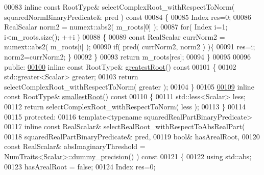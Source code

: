 \begin{DoxyCode}
00083     \textcolor{keyword}{inline} \textcolor{keyword}{const} RootType& selectComplexRoot\_withRespectToNorm( squaredNormBinaryPredicate& pred )\textcolor{keyword}{ const}
00084 \textcolor{keyword}{    }\{
00085       Index res=0;
00086       RealScalar norm2 = numext::abs2( m\_roots[0] );
00087       \textcolor{keywordflow}{for}( Index i=1; i<m\_roots.size(); ++i )
00088       \{
00089         \textcolor{keyword}{const} RealScalar currNorm2 = numext::abs2( m\_roots[i] );
00090         \textcolor{keywordflow}{if}( pred( currNorm2, norm2 ) )\{
00091           res=i; norm2=currNorm2; \}
00092       \}
00093       \textcolor{keywordflow}{return} m\_roots[res];
00094     \}
00095 
00096   \textcolor{keyword}{public}:
\hyperlink{class_eigen_1_1_polynomial_solver_base_a0327769cc88877a79c7c838f03d78384}{00100}     \textcolor{keyword}{inline} \textcolor{keyword}{const} RootType& \hyperlink{class_eigen_1_1_polynomial_solver_base_a0327769cc88877a79c7c838f03d78384}{greatestRoot}()\textcolor{keyword}{ const}
00101 \textcolor{keyword}{    }\{
00102       std::greater<Scalar> greater;
00103       \textcolor{keywordflow}{return} selectComplexRoot\_withRespectToNorm( greater );
00104     \}
00105 
\hyperlink{class_eigen_1_1_polynomial_solver_base_a64389d0acf586c772fb3d1db47a3f7ef}{00109}     \textcolor{keyword}{inline} \textcolor{keyword}{const} RootType& \hyperlink{class_eigen_1_1_polynomial_solver_base_a64389d0acf586c772fb3d1db47a3f7ef}{smallestRoot}()\textcolor{keyword}{ const}
00110 \textcolor{keyword}{    }\{
00111       std::less<Scalar> less;
00112       \textcolor{keywordflow}{return} selectComplexRoot\_withRespectToNorm( less );
00113     \}
00114 
00115   \textcolor{keyword}{protected}:
00116     \textcolor{keyword}{template}<\textcolor{keyword}{typename} squaredRealPartBinaryPredicate>
00117     \textcolor{keyword}{inline} \textcolor{keyword}{const} RealScalar& selectRealRoot\_withRespectToAbsRealPart(
00118         squaredRealPartBinaryPredicate& pred,
00119         \textcolor{keywordtype}{bool}& hasArealRoot,
00120         \textcolor{keyword}{const} RealScalar& absImaginaryThreshold = 
      \hyperlink{group___core___module_struct_eigen_1_1_num_traits}{NumTraits<Scalar>::dummy\_precision}() )\textcolor{keyword}{ const}
00121 \textcolor{keyword}{    }\{
00122       \textcolor{keyword}{using} std::abs;
00123       hasArealRoot = \textcolor{keyword}{false};
00124       Index res=0;

\end{DoxyCode}
